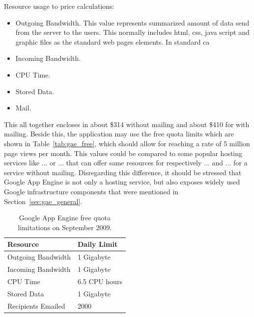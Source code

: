 Resource usage to price calculations:
\begin{itemize}
\item{Outgoing Bandwidth. This value represents summarized amount of data send from the server to the users. This normally includes html, css, java script and graphic files as the standard web pages elements. In standard ca  }
\item{Incoming Bandwidth. }
\item{CPU Time. }
\item{Stored Data. }
\item{Mail. }
\end{itemize} 
This all together encloses in about \$314 without mailing and about \$410 for with mailing. Beside this, the application may use the free quota limits which are shown in Table~\ref{tab:gae_free}, which should allow for reaching a rate of 5 million page views per month. This values could be compared to some popular hosting services like ... or ... that can offer same resources for respectively ... and ... for a service without mailing. Disregarding this difference, it should be stressed that Google App Engine is not only a hosting service, but also exposes widely used Google infrastructure components that were mentioned in Section~\ref{sec:gae_general}.   
\begin{table}[h]
\centering
\caption{Google App Engine free quota limitations on September 2009.}
\label{tab:gae_cost}
\begin{tabular}{|l|l|} \hline \hline
\textbf{Resource} & \textbf{Daily Limit} \\ \hline \hline
Outgoing Bandwidth & 1 Gigabyte \\ \hline
Incoming Bandwidth & 1 Gigabyte \\ \hline
CPU Time & 6.5 CPU hours \\ \hline
Stored Data & 1 Gigabyte \\ \hline
Recipients Emailed & 2000 \\ \hline \hline
\end{tabular}
\end{table}



